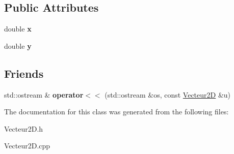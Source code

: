 \subsection*{Public Attributes}
\begin{DoxyCompactItemize}
\item 
\mbox{\label{class_vecteur2_d_a3a18b26b7d21dd930e3b0d22ba8ae4ee}} 
double {\bfseries x}
\item 
\mbox{\label{class_vecteur2_d_a3c8beeb57ed70e29fb603b46798a5d9e}} 
double {\bfseries y}
\end{DoxyCompactItemize}
\subsection*{Friends}
\begin{DoxyCompactItemize}
\item 
\mbox{\label{class_vecteur2_d_acb751f57e5d482ffc1e716141d71fe8f}} 
std\+::ostream \& {\bfseries operator$<$$<$} (std\+::ostream \&os, const \mbox{\hyperlink{class_vecteur2_d}{Vecteur2D}} \&u)
\end{DoxyCompactItemize}


The documentation for this class was generated from the following files\+:\begin{DoxyCompactItemize}
\item 
Vecteur2\+D.\+h\item 
Vecteur2\+D.\+cpp\end{DoxyCompactItemize}
